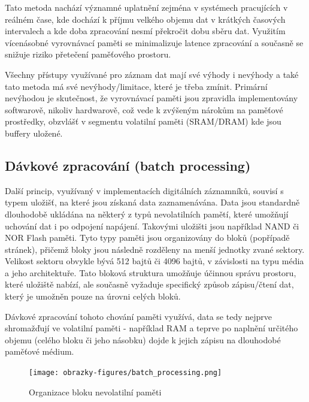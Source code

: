 Tato metoda nachází významné uplatnění zejména v systémech pracujících v reálném čase, kde dochází k příjmu velkého objemu dat v krátkých časových intervalech a kde doba zpracování nesmí překročit dobu sběru dat. Využitím vícenásobné vyrovnávací paměti se minimalizuje latence zpracování a současně se snižuje riziko přetečení paměťového prostoru. \cite{buffering_chang}

Všechny přístupy využívané pro záznam dat mají své výhody i nevýhody a také tato metoda má své nevýhody/limitace, které je třeba zmínit. Primární nevýhodou je skutečnost, že vyrovnávací paměti jsou zpravidla implementovány softwarově, nikoliv hardwarově, což vede k zvýšeným nárokům na paměťové prostředky, obzvlášť v segmentu volatilní paměti (SRAM/DRAM) kde jsou buffery uložené. \cite{basics_of_digital_forensics}

\subsection{Dávkové zpracování (batch processing)}
\label{davkove_zpracovani}
Další princip, využívaný v implementacích digitálních záznamníků, souvisí s typem uložišť, na které jsou získaná data zaznamenávána. Data jsou standardně dlouhodobě ukládána na některý z typů nevolatilních pamětí, které umožňují uchování dat i po odpojení napájení. Takovými uložišti jsou například NAND či NOR Flash paměti. Tyto typy paměti jsou organizovány do bloků (popřípadě stránek), přičemž bloky jsou následně rozděleny na menší jednotky zvané sektory. Velikost sektoru obvykle bývá 512 bajtů či 4096 bajtů, v závislosti na typu média a jeho architektuře. Tato bloková struktura umožňuje účinnou správu prostoru, které uložiště nabízí, ale současně vyžaduje specifický způsob zápisu/čtení dat, který je umožněn pouze na úrovni celých bloků. \cite{tech_target_nand_flash, non_volatile_memories}

Dávkové zpracování tohoto chování paměti využívá, data se tedy nejprve shromažďují ve volatilní paměti - například RAM a teprve po naplnění určitého objemu (celého bloku či jeho násobku) dojde k jejich zápisu na dlouhodobé paměťové médium.

\begin{figure}[h]
    \centering
    \texttt{[image: obrazky-figures/batch\_processing.png]}
    
    \caption{Organizace bloku nevolatilní paměti \cite{ieee_relationships_among_region_segment_frame_and_cluster}}
    \label{fig:batch-processing}
\end{figure}

